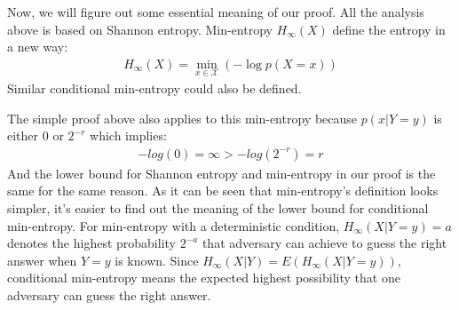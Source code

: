 \documentclass[10pt, conference, compsocconf]{IEEEtran}
\begin{document}
%
%

	Now, we will figure out some essential meaning of our proof.
    All the analysis above is based on Shannon entropy.
    Min-entropy $H_\infty(X)$ define the entropy in a new way:
    \begin{align*}
        H_\infty(X) = \min_{x \in \mathcal X} \left(-\log p\left(X = x\right) \right)
    \end{align*}
    Similar conditional min-entropy could also be defined.

    The simple proof above also applies to this min-entropy
    because $p(x | Y = y)$ is either $0$ or $2^{-r}$ which implies:
    \begin{align*}
        -log(0) = \infty > -log(2^{-r}) = r
    \end{align*}
    And the lower bound for Shannon entropy and min-entropy
    in our proof is the same for the same reason.
    As it can be seen that min-entropy's definition looks simpler,
    it's easier to find out the meaning of the lower
    bound for conditional min-entropy. For min-entropy with a deterministic condition,
    $H_\infty(X | Y = y) = a$
    denotes the highest probability $2^{-a}$ that adversary can achieve to guess
    the right answer when $Y = y$ is known.
    Since $H_\infty(X | Y) = E\left(H_\infty(X | Y = y)\right)$,
    conditional min-entropy means the expected highest
    possibility that one adversary can guess the right answer.
    
\end{document}
